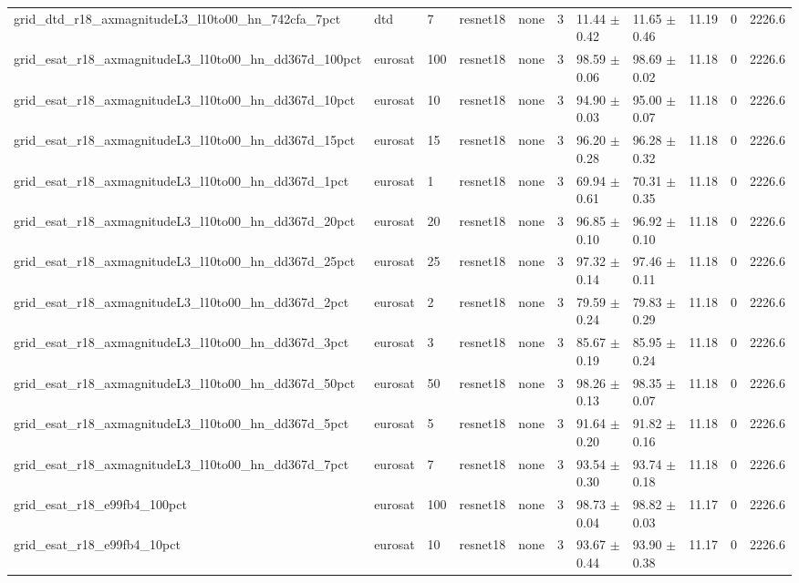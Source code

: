 \begin{tabular}{lllllllllll}
grid_dtd_r18_axmagnitudeL3_l10to00_hn_742cfa_7pct & dtd & 7 & resnet18 & none & 3 & 11.44 $\pm$ 0.42 & 11.65 $\pm$ 0.46 & 11.19 & 0 & 2226.6 \\
grid_esat_r18_axmagnitudeL3_l10to00_hn_dd367d_100pct & eurosat & 100 & resnet18 & none & 3 & 98.59 $\pm$ 0.06 & 98.69 $\pm$ 0.02 & 11.18 & 0 & 2226.6 \\
grid_esat_r18_axmagnitudeL3_l10to00_hn_dd367d_10pct & eurosat & 10 & resnet18 & none & 3 & 94.90 $\pm$ 0.03 & 95.00 $\pm$ 0.07 & 11.18 & 0 & 2226.6 \\
grid_esat_r18_axmagnitudeL3_l10to00_hn_dd367d_15pct & eurosat & 15 & resnet18 & none & 3 & 96.20 $\pm$ 0.28 & 96.28 $\pm$ 0.32 & 11.18 & 0 & 2226.6 \\
grid_esat_r18_axmagnitudeL3_l10to00_hn_dd367d_1pct & eurosat & 1 & resnet18 & none & 3 & 69.94 $\pm$ 0.61 & 70.31 $\pm$ 0.35 & 11.18 & 0 & 2226.6 \\
grid_esat_r18_axmagnitudeL3_l10to00_hn_dd367d_20pct & eurosat & 20 & resnet18 & none & 3 & 96.85 $\pm$ 0.10 & 96.92 $\pm$ 0.10 & 11.18 & 0 & 2226.6 \\
grid_esat_r18_axmagnitudeL3_l10to00_hn_dd367d_25pct & eurosat & 25 & resnet18 & none & 3 & 97.32 $\pm$ 0.14 & 97.46 $\pm$ 0.11 & 11.18 & 0 & 2226.6 \\
grid_esat_r18_axmagnitudeL3_l10to00_hn_dd367d_2pct & eurosat & 2 & resnet18 & none & 3 & 79.59 $\pm$ 0.24 & 79.83 $\pm$ 0.29 & 11.18 & 0 & 2226.6 \\
grid_esat_r18_axmagnitudeL3_l10to00_hn_dd367d_3pct & eurosat & 3 & resnet18 & none & 3 & 85.67 $\pm$ 0.19 & 85.95 $\pm$ 0.24 & 11.18 & 0 & 2226.6 \\
grid_esat_r18_axmagnitudeL3_l10to00_hn_dd367d_50pct & eurosat & 50 & resnet18 & none & 3 & 98.26 $\pm$ 0.13 & 98.35 $\pm$ 0.07 & 11.18 & 0 & 2226.6 \\
grid_esat_r18_axmagnitudeL3_l10to00_hn_dd367d_5pct & eurosat & 5 & resnet18 & none & 3 & 91.64 $\pm$ 0.20 & 91.82 $\pm$ 0.16 & 11.18 & 0 & 2226.6 \\
grid_esat_r18_axmagnitudeL3_l10to00_hn_dd367d_7pct & eurosat & 7 & resnet18 & none & 3 & 93.54 $\pm$ 0.30 & 93.74 $\pm$ 0.18 & 11.18 & 0 & 2226.6 \\
grid_esat_r18_e99fb4_100pct & eurosat & 100 & resnet18 & none & 3 & 98.73 $\pm$ 0.04 & 98.82 $\pm$ 0.03 & 11.17 & 0 & 2226.6 \\
grid_esat_r18_e99fb4_10pct & eurosat & 10 & resnet18 & none & 3 & 93.67 $\pm$ 0.44 & 93.90 $\pm$ 0.38 & 11.17 & 0 & 2226.6 \\

\end{tabular}
